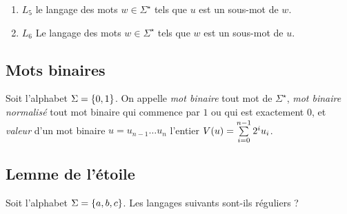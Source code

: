 \documentclass[a4paper,french,bookmarks]{book}
\begin{document}
\begin{enumerate}
        
        \item $L_5$ le langage des mots $w \in \Sigma^\star$ tels que $u$ est un sous-mot de $w$.
        
        
        \item $L_6$ Le langage des mots $w \in \Sigma^\star$ tels que $w$ est un sous-mot de $u$.
    \end{enumerate}
    
    \subsection{Mots binaires}
    
    Soit l'alphabet $\Sigma = \left\{0, 1\right\}$. On appelle \emph{mot binaire} tout mot de $\Sigma^\star$, \emph{mot binaire normalisé} tout mot binaire qui commence par $1$ ou qui est exactement $0$, et \emph{valeur} d'un mot binaire $u = u_{n-1}\dots u_n$ l'entier $V\!\left(u\right) = \sum\limits_{i=0}^{n-1} 2^iu_i$.
    
    \subsection{Lemme de l'étoile}
    
    Soit l'alphabet $\Sigma = \left\{a, b, c\right\}$. Les langages suivants sont-ils réguliers ?
    
\end{document}
